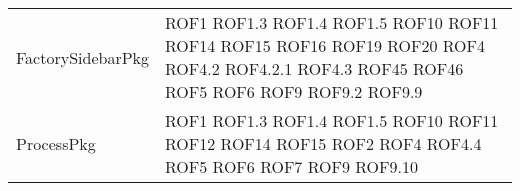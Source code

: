 \begin{longtable}{p{5cm}!{\VRule[1pt]}p{2.5cm}}
		FactorySidebarPkg & ROF1 \newline ROF1.3 \newline ROF1.4 \newline ROF1.5 \newline ROF10 \newline ROF11 \newline ROF14 \newline ROF15 \newline ROF16 \newline ROF19 \newline ROF20 \newline ROF4 \newline ROF4.2 \newline ROF4.2.1 \newline ROF4.3 \newline ROF45 \newline ROF46 \newline ROF5 \newline ROF6 \newline ROF9 \newline ROF9.2 \newline ROF9.9\\
		ProcessPkg & ROF1 \newline ROF1.3 \newline ROF1.4 \newline ROF1.5 \newline ROF10 \newline ROF11 \newline ROF12 \newline ROF14 \newline ROF15 \newline ROF2 \newline ROF4 \newline ROF4.4 \newline ROF5 \newline ROF6 \newline ROF7 \newline ROF9 \newline ROF9.10\\

\end{longtable}

